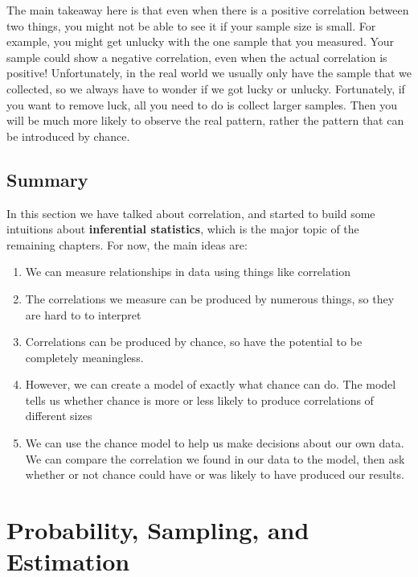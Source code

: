 \documentclass[
]{book}
\providecommand{\tightlist}{%
  \setlength{\itemsep}{0pt}\setlength{\parskip}{0pt}}
\begin{document}
The main takeaway here is that even when there is a positive correlation between two things, you might not be able to see it if your sample size is small. For example, you might get unlucky with the one sample that you measured. Your sample could show a negative correlation, even when the actual correlation is positive! Unfortunately, in the real world we usually only have the sample that we collected, so we always have to wonder if we got lucky or unlucky. Fortunately, if you want to remove luck, all you need to do is collect larger samples. Then you will be much more likely to observe the real pattern, rather the pattern that can be introduced by chance.

\hypertarget{summary}{%
\section{Summary}\label{summary}}

In this section we have talked about correlation, and started to build some intuitions about \textbf{inferential statistics}, which is the major topic of the remaining chapters. For now, the main ideas are:

\begin{enumerate}
\def\labelenumi{\arabic{enumi}.}
\tightlist
\item
  We can measure relationships in data using things like correlation
\item
  The correlations we measure can be produced by numerous things, so they are hard to to interpret
\item
  Correlations can be produced by chance, so have the potential to be completely meaningless.
\item
  However, we can create a model of exactly what chance can do. The model tells us whether chance is more or less likely to produce correlations of different sizes
\item
  We can use the chance model to help us make decisions about our own data. We can compare the correlation we found in our data to the model, then ask whether or not chance could have or was likely to have produced our results.
\end{enumerate}

\hypertarget{probability-sampling-and-estimation}{%
\chapter{Probability, Sampling, and Estimation}\label{probability-sampling-and-estimation}}
\end{document}
